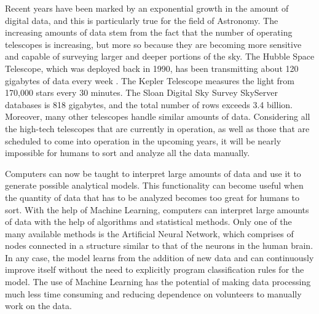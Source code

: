 \documentclass[a4paper, 12pt]{report}
\theoremstyle{definition}
\begin{document}
Recent years have been marked by an exponential growth in the amount of digital data, and this is particularly true for the field of Astronomy. The increasing amounts of data stem from the fact that the number of operating telescopes is increasing, but more so because they are becoming more sensitive and capable of surveying larger and deeper portions of the sky. The Hubble Space Telescope, which was deployed back in 1990, has been transmitting about 120 gigabytes of data every week \autocite{hubblesite}. The Kepler Telescope measures the light from 170,000 stars every 30 minutes. \autocite{keplar} The Sloan Digital Sky Survey SkyServer databases is 818 gigabytes, and the total number of rows exceeds 3.4 billion. \autocite{sdsssite} Moreover, many other telescopes handle similar amounts of data. Considering all the high-tech telescopes that are currently in operation, as well as those that are scheduled to come into operation in the upcoming years, it will be nearly impossible for humans to sort and analyze all the data manually.

Computers can now be taught to interpret large amounts of data and use it to generate possible analytical models. This functionality can become useful when the quantity of data that has to be analyzed becomes too great for humans to sort. With the help of Machine Learning, computers can interpret large amounts of data with the help of algorithms and statistical methods. Only one of the many available methods is the Artificial Neural Network, which comprises of nodes connected in a structure similar to that of the neurons in the human brain. In any case, the model learns from the addition of new data and can continuously improve itself without the need to explicitly program classification rules for the model. The use of Machine Learning has the potential of making data processing much less time consuming and reducing dependence on volunteers to manually work on the data.

\end{document}
